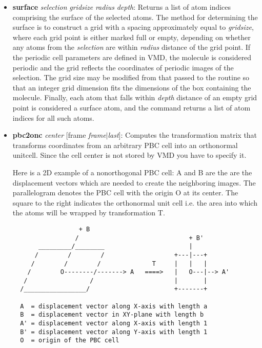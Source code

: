 \begin{itemize}
\item {\bf surface} {\it selection} {\it gridsize} {\it radius} {\it depth}:
  Returns a list of atom indices comprising the surface of the 
selected atoms.  The method for determining the surface is to 
construct a grid with a spacing approximately equal to {\it gridsize}, 
where each grid point is either marked full or empty, depending on 
whether any atoms from the {\it selection} are within {\it radius} 
distance of the grid point. If the periodic cell parameters are 
defined in VMD, the molecule is considered periodic and the grid 
reflects the coordinates of periodic images of the selection. 
The grid size may be modified from that passed to the routine so 
that an integer grid dimension fits the dimensions of the box 
containing the molecule. Finally, each atom that falls within 
{\it depth} distance of an empty grid point is considered a 
surface atom, and the command returns a list of atom indices 
for all such atoms.

\item {\bf pbc2onc} {\it center} [frame {\it frame$\mid$last}]:
  Computes the transformation matrix that transforms coordinates from an arbitrary PBC cell 
  into an orthonormal unitcell. Since the cell center is not stored by VMD
  you have to specify it.

  Here is a 2D example of a nonorthogonal PBC cell:
  A and B are the are the displacement vectors which are needed to create 
  the neighboring images. The parallelogram denotes the PBC cell with the origin O at its center.
  The square to the right indicates the orthonormal unit cell i.e. the area into which the atoms 
  will be wrapped by transformation T.


  \begin{minipage}[t]{\textwidth}
  \setlength{\baselineskip}{2.5ex}
  \begin{verbatim}
                  + B                                        
                 /                              + B'         
       _________/________                       |            
      /        /        /                   +---|---+        
     /        /        /              T     |   |   |        
    /        O--------/-------> A   ====>   |   O---|--> A'  
   /                 /                      |       |        
  /_________________/                       +-------+        
  
  A  = displacement vector along X-axis with length a
  B  = displacement vector in XY-plane with length b
  A' = displacement vector along X-axis with length 1
  B' = displacement vector along Y-axis with length 1
  O  = origin of the PBC cell
 \end{verbatim}
 \end{minipage}



\end{itemize}
